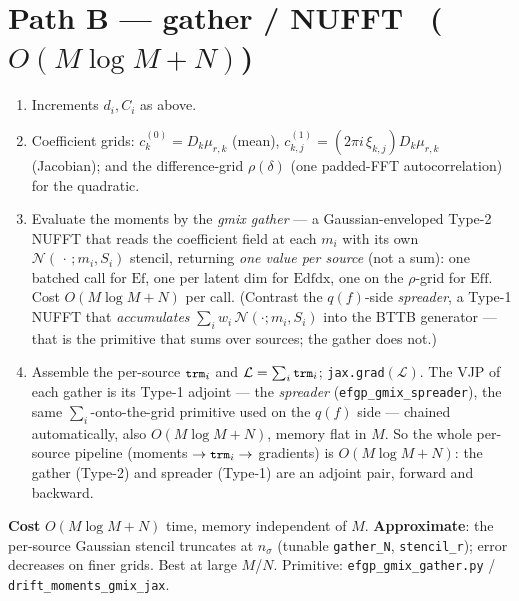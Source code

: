 \documentclass[11pt]{article}
\newcommand{\code}[1]{\texttt{\small #1}}
\begin{document}
\section{Path B --- gather / NUFFT \ ($O(M\log M + N)$)}
\begin{enumerate}[leftmargin=1.6em,itemsep=2pt]
\item Increments $d_i,C_i$ as above.
\item Coefficient grids: $c^{(0)}_k=D_k\mu_{r,k}$ (mean),
  $c^{(1)}_{k,j}=(2\pi i\,\xi_{k,j})D_k\mu_{r,k}$ (Jacobian); and the
  difference-grid $\rho(\delta)$ (one padded-FFT autocorrelation) for the
  quadratic.
\item Evaluate the moments by the \emph{gmix gather} --- a
  Gaussian-enveloped Type-2 NUFFT that reads the coefficient field at each
  $m_i$ with its own $\mathcal N(\,\cdot\,;m_i,S_i)$ stencil, returning
  \emph{one value per source} (not a sum): one batched call for
  $\mathrm{Ef}$, one per latent dim for $\mathrm{Edfdx}$, one on the
  $\rho$-grid for $\mathrm{Eff}$. Cost $O(M\log M + N)$ per call. (Contrast
  the $q(f)$-side \emph{spreader}, a Type-1 NUFFT that \emph{accumulates}
  $\sum_i w_i\,\mathcal N(\cdot;m_i,S_i)$ into the BTTB generator --- that
  is the primitive that sums over sources; the gather does not.)
\item Assemble the per-source $\code{trm}_i$ and $\mathcal L=\sum_i\code{trm}_i$;
  \code{jax.grad}$(\mathcal L)$. The VJP of each gather is its Type-1 adjoint
  --- the \emph{spreader} (\code{efgp\_gmix\_spreader}), the same
  $\sum_i$-onto-the-grid primitive used on the $q(f)$ side --- chained
  automatically, also $O(M\log M + N)$, memory flat in $M$.
  So the whole per-source pipeline (moments $\to \code{trm}_i \to$ gradients)
  is $O(M\log M + N)$: the gather (Type-2) and spreader (Type-1) are an
  adjoint pair, forward and backward.
\end{enumerate}
\textbf{Cost} $O(M\log M + N)$ time, memory independent of $M$.
\textbf{Approximate}: the per-source Gaussian stencil truncates at
$n_\sigma$ (tunable \code{gather\_N}, \code{stencil\_r}); error decreases
on finer grids. Best at large $M$/$N$. Primitive:
\code{efgp\_gmix\_gather.py} / \code{drift\_moments\_gmix\_jax}.

\end{document}
